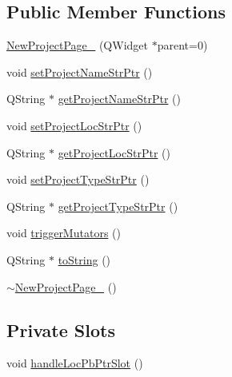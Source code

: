 \subsection*{Public Member Functions}
\begin{DoxyCompactItemize}
\item 
\hyperlink{class_new_project_page__2_a3091d785da72b2f9f43a82ed362305d1}{New\-Project\-Page\-\_} (Q\-Widget $\ast$parent=0)
\item 
void \hyperlink{class_new_project_page__2_a542d8acd5d97a5541c772a5ca7010c8c}{set\-Project\-Name\-Str\-Ptr} ()
\item 
Q\-String $\ast$ \hyperlink{class_new_project_page__2_acd99862f523b3986d39ea57a9a521aec}{get\-Project\-Name\-Str\-Ptr} ()
\item 
void \hyperlink{class_new_project_page__2_aa1ce052f5e700173eee0f73352e0d926}{set\-Project\-Loc\-Str\-Ptr} ()
\item 
Q\-String $\ast$ \hyperlink{class_new_project_page__2_a5b414441b86e09c1f3e35612a5f210ff}{get\-Project\-Loc\-Str\-Ptr} ()
\item 
void \hyperlink{class_new_project_page__2_a5c03c4b42d0749763cfb0666550a5fba}{set\-Project\-Type\-Str\-Ptr} ()
\item 
Q\-String $\ast$ \hyperlink{class_new_project_page__2_a3ddcd41d933c5f8cf3c6040122ee2d0e}{get\-Project\-Type\-Str\-Ptr} ()
\item 
void \hyperlink{class_new_project_page__2_aedf2995005e1d3e376d34f83a2b064a4}{trigger\-Mutators} ()
\item 
Q\-String $\ast$ \hyperlink{class_new_project_page__2_a57590dbeb6504e2c6aef8f5b4243672c}{to\-String} ()
\item 
\hyperlink{class_new_project_page__2_a4d76fcc79e976b428825449c45156ed5}{$\sim$\-New\-Project\-Page\-\_} ()
\end{DoxyCompactItemize}
\subsection*{Private Slots}
\begin{DoxyCompactItemize}
\item 
void \hyperlink{class_new_project_page__2_ad6313493cc847b62a1c219c4ff92ff02}{handle\-Loc\-Pb\-Ptr\-Slot} ()
\end{DoxyCompactItemize}
